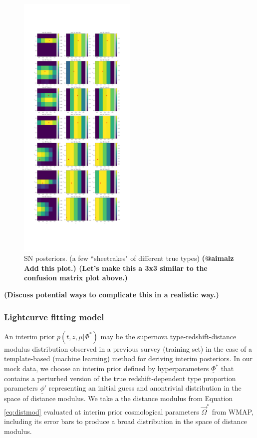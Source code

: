 \documentclass[12pt, twocolumn]{emulateapj}
\newcommand{\textul}{\underline}
\begin{document}
\begin{figure}
	\begin{center}
		\includegraphics[width=0.5\textwidth]{fig/lc_likelihoods.png}
		\caption{SN posteriors.  
		(a few ``sheetcakes" of different true types)  \textbf{(@aimalz Add this plot.) 
		(Let's make this a 3x3 similar to the confusion matrix plot above.)}}
		\label{fig:SNposts}
	\end{center}
\end{figure}

\textbf{(Discuss potential ways to complicate this in a realistic way.)}

\subsubsection{Lightcurve fitting model}
\label{sec:snlcinterim}

An interim prior $p(t, z, \mu | \textul{\Phi}^{*})$ may be the supernova type-redshift-distance modulus distribution observed in a previous survey (training set) in the case of a template-based (machine learning) method for deriving interim posteriors.  
In our mock data, we choose an interim prior defined by hyperparameters $\textul{\Phi}^{*}$ that contains a perturbed version of the true redshift-dependent type proportion parameters $\textul{\phi}'$ representing an initial guess and anontrivial distribution in the space of distance modulus.  
We take a the distance modulus from Equation \ref{eq:distmod} evaluated at interim prior cosmological parameters $\vec{\Omega}^{*}$ from WMAP, including its error bars to produce a broad distribution in the space of distance modulus.
\end{document}
